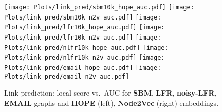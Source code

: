 \begin{figure}[ht]
    \centering
    \texttt{[image: Plots/link\_pred/sbm10k\_hope\_auc.pdf]}
        \hspace{.1cm}
    \texttt{[image: Plots/link\_pred/sbm10k\_n2v\_auc.pdf]}
    \vspace{.1cm}
    \texttt{[image: Plots/link\_pred/lfr10k\_hope\_auc.pdf]}
        \hspace{.1cm}
    \texttt{[image: Plots/link\_pred/lfr10k\_n2v\_auc.pdf]}
    \vspace{.1cm}
    \texttt{[image: Plots/link\_pred/nlfr10k\_hope\_auc.pdf]}
        \hspace{.1cm}
    \texttt{[image: Plots/link\_pred/nlfr10k\_n2v\_auc.pdf]}
    \vspace{.1cm}
    \texttt{[image: Plots/link\_pred/email\_hope\_auc.pdf]}
        \hspace{.1cm}
    \texttt{[image: Plots/link\_pred/email\_n2v\_auc.pdf]}
    \caption{Link prediction: local score vs.\ AUC for \textbf{SBM}, \textbf{LFR}, \textbf{noisy-LFR}, \textbf{EMAIL} graphs and \textbf{HOPE} (left), \textbf{Node2Vec} (right) embeddings.}
    \label{fig:link_pred}
\end{figure}


%
%


